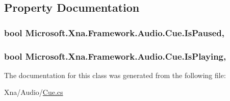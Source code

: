 \subsection{Property Documentation}
\hypertarget{class_microsoft_1_1_xna_1_1_framework_1_1_audio_1_1_cue_ac93058cebd8f71c1e313a46470306575}{}
\subsubsection[{Is\+Paused}]{\setlength{\rightskip}{0pt plus 5cm}bool Microsoft.\+Xna.\+Framework.\+Audio.\+Cue.\+Is\+Paused\hspace{0.3cm}{\ttfamily [get]}, {\ttfamily [set]}}\label{class_microsoft_1_1_xna_1_1_framework_1_1_audio_1_1_cue_ac93058cebd8f71c1e313a46470306575}
\hypertarget{class_microsoft_1_1_xna_1_1_framework_1_1_audio_1_1_cue_a53f721e55dd582f554baf2fc06f00f43}{}
\subsubsection[{Is\+Playing}]{\setlength{\rightskip}{0pt plus 5cm}bool Microsoft.\+Xna.\+Framework.\+Audio.\+Cue.\+Is\+Playing\hspace{0.3cm}{\ttfamily [get]}, {\ttfamily [set]}}\label{class_microsoft_1_1_xna_1_1_framework_1_1_audio_1_1_cue_a53f721e55dd582f554baf2fc06f00f43}


The documentation for this class was generated from the following file\+:\begin{DoxyCompactItemize}
\item 
Xna/\+Audio/\hyperlink{_cue_8cs}{Cue.\+cs}\end{DoxyCompactItemize}

